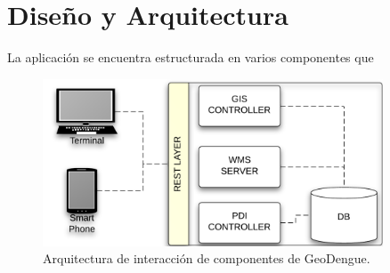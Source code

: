 \section{Diseño y Arquitectura}

La aplicación se encuentra estructurada en varios componentes que 


\begin{figure}
\centering
\includegraphics[width=0.9\textwidth]{capitulo-5/graphics/arquitectura-completa.png}
\caption{\label{fig:arquitectura-completa}Arquitectura de interacción de componentes de GeoDengue.}
\end{figure}
